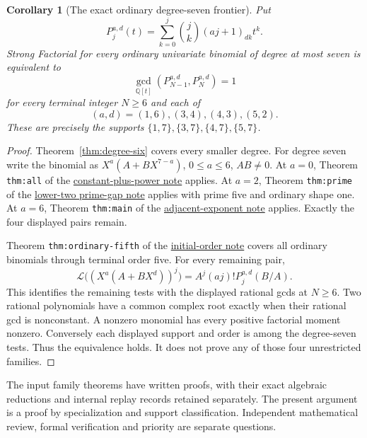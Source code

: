 \documentclass[11pt]{article}
\newtheorem{corollary}[theorem]{Corollary}
\begin{document}
\begin{corollary}[The exact ordinary degree-seven frontier]
\label{cor:degree-seven-frontier}
Put
\[
 P_j^{a,d}(t)=\sum_{k=0}^j\binom jk(aj+1)_{dk}t^k.
\]
Strong Factorial for every ordinary univariate binomial of degree
at most seven is equivalent to
\[
 \gcd_{\mathbb Q[t]}(P_{N-1}^{a,d},P_N^{a,d})=1
\]
for every terminal integer $N\ge6$ and each of
\[
 (a,d)=(1,6),(3,4),(4,3),(5,2).
\]
These are precisely the supports
$\{1,7\},\{3,7\},\{4,7\},\{5,7\}$.
\end{corollary}
\begin{proof}
Theorem~\ref{thm:degree-six} covers every smaller degree.
For degree seven write the binomial as
$X^a(A+BX^{7-a})$, $0\le a\le6$, $AB\ne0$.
At $a=0$, Theorem \texttt{thm:all} of the
\href{ALL_UNIVARIATE_TWO_TERM_SFC.tex}{constant-plus-power note}
applies. At $a=2$, Theorem \texttt{thm:prime} of the
\href{LOWER_TWO_PRIME_GAP_SFC.tex}{lower-two prime-gap note}
applies with prime five and ordinary shape one.
At $a=6$, Theorem \texttt{thm:main} of the
\href{UNIFORM_PADE_PARABOLA_SFC.tex}{adjacent-exponent note}
applies. Exactly the four displayed pairs remain.

Theorem \texttt{thm:ordinary-fifth} of the
\href{lower_exponent_initial_and_boundary.tex}{initial-order note}
covers all ordinary binomials through terminal order five.
For every remaining pair,
\[
 \mathcal L\bigl((X^a(A+BX^d))^j\bigr)
       =A^j(aj)!P_j^{a,d}(B/A).
\]
This identifies the remaining tests with the displayed rational
gcds at $N\ge6$. Two rational polynomials have a common complex root
exactly when their rational gcd is nonconstant. A nonzero monomial
has every positive factorial moment nonzero.
Conversely each displayed support and order is among the degree-seven
tests. Thus the equivalence holds. It does not prove any of those
four unrestricted families.
\end{proof}

The input family theorems have written proofs, with their exact
algebraic reductions and internal replay records retained separately.
The present argument is a proof by specialization and support
classification. Independent mathematical review, formal verification
and priority are separate questions.
\end{document}
